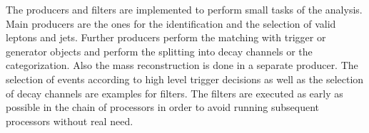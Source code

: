 \documentclass[3p]{elsarticle}
\begin{document}
The producers and filters are implemented to perform small tasks of the analysis.
Main producers are the ones for the identification and the selection of valid leptons and jets.
Further producers perform the matching with trigger or generator objects and perform the splitting into decay channels or the categorization.
Also the mass reconstruction is done in a separate producer.
The selection of events according to high level trigger decisions as well as the selection of decay channels are examples for filters.
The filters are executed as early as possible in the chain of processors in order to avoid running subsequent processors without real need.

\end{document}
